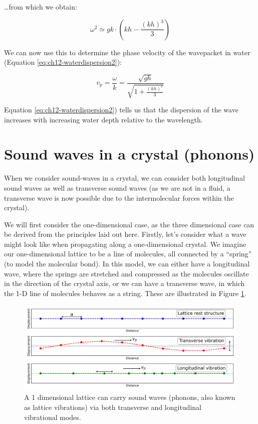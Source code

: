 \documentclass[
]{book}
\begin{document}
\ldots from which we obtain:

\begin{equation}
\omega^2 \simeq gk \cdot \left(kh - \frac{(kh)^3}{3} \right)
\end{equation}

We can now use this to determine the phase velocity of the wavepacket in water (Equation \eqref{eq:ch12-waterdispersion2}):

\begin{equation}
v_p = \frac{\omega}{k} = \frac{\sqrt{gh}}{\sqrt{1+\frac{(kh)^2}{3}}}
\label{eq:ch12-waterdispersion2}
\end{equation}

Equation \eqref{eq:ch12-waterdispersion2}) tells us that the dispersion of the wave increases with increasing water depth relative to the wavelength.

\hypertarget{sec:ch12-phonondispersion}{%
\section{Sound waves in a crystal (phonons)}\label{sec:ch12-phonondispersion}}

When we consider sound-waves in a crystal, we can consider both longitudinal sound waves as well as transverse sound waves (as we are not in a fluid, a transverse wave is now possible due to the intermolecular forces within the crystal).

We will first consider the one-dimensional case, as the three dimensional case can be derived from the principles laid out here. Firstly, let's consider what a wave might look like when propagating along a one-dimensional crystal. We imagine our one-dimensional lattice to be a line of molecules, all connected by a ``spring'' (to model the molecular bond). In this model, we can either have a longitudinal wave, where the springs are stretched and compressed as the molecules oscillate in the direction of the crystal axis, or we can have a transverse wave, in which the 1-D line of molecules behaves as a string. These are illustrated in Figure \ref{fig:ch12-phononvibration1}.

\begin{figure}

{\centering \includegraphics[width=0.7\linewidth]{visualisations/ch12-phonons1} 

}

\caption{A 1 dimensional lattice can carry sound waves (phonons, also known as lattice vibrations) via both transverse and longitudinal vibrational modes. }\label{fig:ch12-phononvibration1}
\end{figure}
\end{document}

